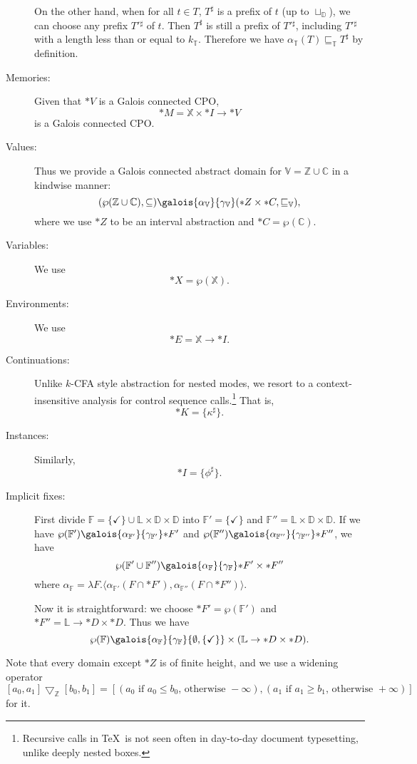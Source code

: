 \documentclass[a4paper]{article}
\newcommand*{\power}[1]{\wp(#1)}
\newcommand*{\dom}[1]{\mathbb{#1}}
\newcommand*{\Abstract}[1]{\alpha_{\dom{#1}}}
\newcommand*{\Concrete}[1]{\gamma_{\dom{#1}}}
\begin{document}
\begin{description}
  On the other hand, when for all $t \in T$, $T^\sharp$ is a prefix of $t$ (up to $\sqcup_{\dom D}$), we can choose any prefix $T'{}^\sharp$ of $t$.
  Then $T^\sharp$ is still a prefix of $T'{}^\sharp$, including $T'{}^\sharp$ with a length less than or equal to $k_{\dom T}$.
  Therefore we have $\Abstract T(T) \sqsubseteq_{\dom T} T^\sharp$ by definition.
\item[Memories:] Given that $\dom*V$ is a Galois connected CPO, \[\dom*M = \dom X \times \dom*I \to \dom*V\] is a Galois connected CPO.
\item[Values:] Thus we provide a Galois connected abstract domain for $\dom V = \dom Z \cup \dom C$ in a kindwise manner:
  \[ (\power{\dom Z \cup \dom C}, \subseteq) \galois{\Abstract V}{\Concrete V} (\dom*Z \times \dom*C, \sqsubseteq_{\dom V}), \]
  where we use $\dom*Z$ to be an interval abstraction and $\dom*C = \power{\dom C}$.
\item[Variables:] We use \[\dom*X = \power{\dom X}.\]
\item[Environments:] We use \[\dom*E = \dom X \to \dom*I.\]
\item[Continuations:] Unlike $k$-CFA style abstraction for nested modes, we resort to a context-insensitive analysis for control sequence calls.\footnote{Recursive calls in \TeX\ is not seen often in day-to-day document typesetting, unlike deeply nested boxes.}
  That is, \[\dom*K = \{\kappa^\sharp\}.\]
\item[Instances:] Similarly, \[\dom*I = \{\phi^\sharp\}.\]
\item[Implicit fixes:] First divide $\dom F = \{\checkmark\} \cup \dom L \times \dom D \times \dom D$ into $\dom F' = \{\checkmark\}$ and $\dom F'' = \dom L \times \dom D \times \dom D$.
  If we have $\power{\dom{F'{}}} \galois{\Abstract{F'}}{\Concrete{F'}} \dom*{F'{}}$ and $\power{\dom{F''}} \galois{\Abstract{F''}}{\Concrete{F''}} \dom*{F''{}}$,
  we have \[\power{\dom{F'{}} \cup \dom{F''{}}} \galois{\Abstract{F}}{\Concrete{F}} \dom*{F'{}} \times \dom*{F''{}}\]
  where $\Abstract{F} = \lambda F. \langle \Abstract{F'}(F \cap \dom*{F'{}}), \Abstract{F''}(F \cap \dom*{F''{}}) \rangle$.

  Now it is straightforward: we choose $\dom*{F'{}} = \power{\dom F'}$ and $\dom*{F''{}} = \dom L \to \dom*D \times \dom*D$.
  Thus we have
  \[\power{\dom F} \galois{\Abstract{F}}{\Concrete{F}} \{\emptyset, \{\checkmark\}\} \times (\dom L \to \dom*D \times \dom*D).\]
\end{description}

Note that every domain except $\dom*Z$ is of finite height, and we use a widening operator
\[
  [a_0, a_1] \mathbin{▽_{\mathbb{Z}}} [b_0, b_1] = [(a_0\text{ if $a_0 \le b_0$, otherwise }{-}\infty), (a_1\text{ if $a_1 \ge b_1$, otherwise }{+}\infty)]
\]
for it.
\end{document}
